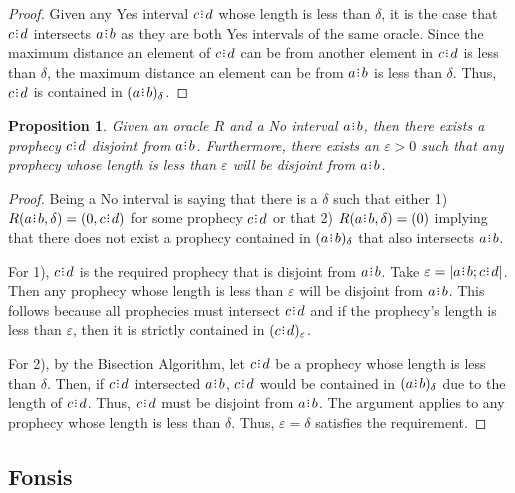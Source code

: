\documentclass[12pt]{article}
\newtheorem{proposition}{Proposition}[section]
\begin{document}
\begin{proof}
    Given any Yes interval $c\rint d$ whose length is less than $\delta$, it is the case that $c\rint d$ intersects $a\rint b$ as they are both Yes intervals of the same oracle. Since the maximum distance an element of $c\rint d$ can be from another element in $c\rint d$ is less than $\delta$, the maximum distance an element can be from $a\rint b$ is less than $\delta$. Thus, $c\rint d$ is contained in $\halo{a\rint b}$.
\end{proof}

\begin{proposition}\label{os-no-disjoint}
    Given an oracle $R$ and a No interval $a\rint b$, then there exists a prophecy $c\rint d$ disjoint from $a\rint b$. Furthermore, there exists an $\varepsilon > 0$ such that any prophecy whose length is less than $\varepsilon$ will be disjoint from $a\rint b$.
\end{proposition}

\begin{proof}
    Being a No interval is saying that there is a $\delta$ such that either 1) $R(a\rint b, \delta) = (0, c\rint d)$ for some prophecy $c\rint d$ or that 2) $R(a\rint b, \delta) = (0)$ implying that there does not exist a prophecy contained in $\halo{a\rint b}$ that also intersects $a\rint b$. 
    
    For 1), $c\rint d$ is the required prophecy that is disjoint from $a\rint b$. Take $\varepsilon = |a\rint b; c\rint d|$. Then any prophecy whose length is less than $\varepsilon$ will be disjoint from $a\rint b$. This follows because all prophecies must intersect $c\rint d$ and if the prophecy's length is less than $\varepsilon$, then it is strictly contained in $\halo[\varepsilon]{c\rint d}$.
    
    For 2), by the Bisection Algorithm, let $c\rint d$ be a prophecy whose length is less than $\delta$. Then, if $c\rint d$ intersected $a\rint b$, $c\rint d$ would be contained in $\halo{a\rint b}$ due to the length of $c\rint d$. Thus, $c\rint d$ must be disjoint from $a\rint b$. The argument applies to any prophecy whose length is less than $\delta$. Thus, $\varepsilon = \delta$ satisfies the requirement. 
\end{proof}



\subsection{Fonsis}\label{os-fonsis}
\end{document}
